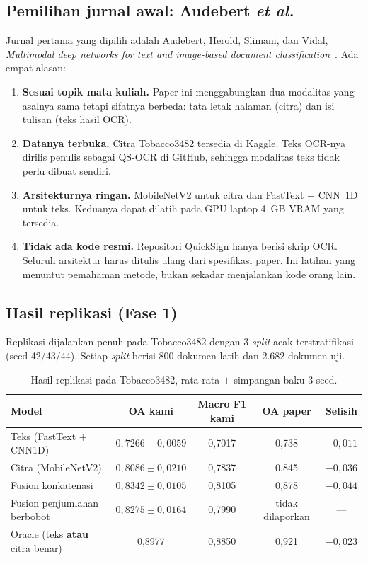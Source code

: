 \documentclass[11pt,a4paper]{article}
\begin{document}
\subsection{Pemilihan jurnal awal: Audebert \textit{et al.}}

Jurnal pertama yang dipilih adalah Audebert, Herold, Slimani, dan Vidal,
\textit{Multimodal deep networks for text and image-based document
classification}~\cite{audebert2020}. Ada empat alasan:

\begin{enumerate}
  \item \textbf{Sesuai topik mata kuliah.} Paper ini menggabungkan dua modalitas yang
  asalnya sama tetapi sifatnya berbeda: tata letak halaman (citra) dan isi tulisan
  (teks hasil OCR).
  \item \textbf{Datanya terbuka.} Citra Tobacco3482 tersedia di Kaggle. Teks OCR-nya
  dirilis penulis sebagai QS-OCR di GitHub, sehingga modalitas teks tidak perlu dibuat
  sendiri.
  \item \textbf{Arsitekturnya ringan.} MobileNetV2 untuk citra dan FastText + CNN~1D
  untuk teks. Keduanya dapat dilatih pada GPU laptop 4~GB VRAM yang tersedia.
  \item \textbf{Tidak ada kode resmi.} Repositori QuickSign hanya berisi skrip OCR.
  Seluruh arsitektur harus ditulis ulang dari spesifikasi paper. Ini latihan yang
  menuntut pemahaman metode, bukan sekadar menjalankan kode orang lain.
\end{enumerate}

\subsection{Hasil replikasi (Fase 1)}\label{sec:fase1}

Replikasi dijalankan penuh pada Tobacco3482 dengan 3 \textit{split} acak
terstratifikasi (seed 42/43/44). Setiap \textit{split} berisi 800 dokumen latih dan
2.682 dokumen uji.

\begin{table}[H]
\centering\small
\caption{Hasil replikasi pada Tobacco3482, rata-rata $\pm$ simpangan baku 3 seed.}
\label{tab:fase1}
\begin{tabular}{@{}lcccc@{}}
\toprule
Model & OA kami & Macro F1 kami & OA paper & Selisih \\
\midrule
Teks (FastText + CNN1D) & $0{,}7266 \pm 0{,}0059$ & 0,7017 & 0,738 & $-0{,}011$ \\
Citra (MobileNetV2) & $0{,}8086 \pm 0{,}0210$ & 0,7837 & 0,845 & $-0{,}036$ \\
Fusion konkatenasi & $0{,}8342 \pm 0{,}0105$ & 0,8105 & 0,878 & $-0{,}044$ \\
Fusion penjumlahan berbobot & $0{,}8275 \pm 0{,}0164$ & 0,7990 & tidak dilaporkan & --- \\
Oracle (teks \textbf{atau} citra benar) & 0,8977 & 0,8850 & 0,921 & $-0{,}023$ \\
\bottomrule
\end{tabular}
\end{table}
\end{document}
